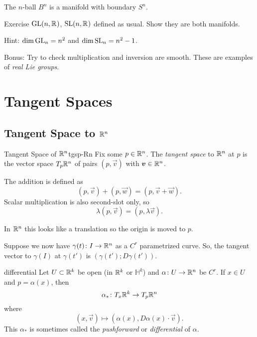 \documentclass{article}
\begin{document}
\begin{corollary}{}{}
  The $n$-ball $B^{n}$ is a manifold with boundary $S^{n}$.
\end{corollary}

\begin{example}{Exercise}{}
  $\GL(n, \RR)$, $\SL(n, \RR)$ defined as usual.
  Show they are both manifolds.

  Hint: $\dim \GL_{n} = n^{2}$ and $\dim \SL_{n} = n^{2} - 1$.

  Bonus: Try to check multiplication and inversion are smooth.
  These are examples of \emph{real Lie groups}.
\end{example}

\section{Tangent Spaces}

\subsection{Tangent Space to $\RR[n]$}

\begin{definition}{Tangent Space of $\RR[n]$}{tgsp-Rn}
  Fix some $p \in \RR[n]$.
  The \emph{tangent space} to $\RR[n]$ at $p$ is
  the vector space $T_{p}\RR[n]$ of pairs $(p, \vec{v})$
  with $\vec{v} \in \RR[n]$.

  The addition is defined as
  \[ (p, \vec{v}) + (p, \vec{w}) = (p, \vec{v} + \vec{w}). \]
  Scalar multiplication is also second-slot only, so
  \[ \lambda(p, \vec{v}) = (p, \lambda\vec{v}). \]
\end{definition}

In $\RR[n]$ this looks like a translation so the origin is moved to $p$.

Suppose we now have $\gamma(t) \from I \to \RR[n]$ as a $C^{r}$ parametrized curve.
So, the tangent vector to $\gamma(I)$ at $\gamma(t')$ is $(\gamma(t'); D\gamma(t'))$.

\begin{definition}{}{differential}
  Let $U \subset \RR[k]$ be open (in $\RR[k]$ or $\mathbb{H}^{k}$)
  and $\alpha \from U \to \RR[n]$ be $C^{r}$.
  If $x \in U$ and $p = \alpha(x)$, then
  \[ \alpha_{*} \from T_{x}\RR[k] \to T_{p}\RR[n] \]
  where
  \[ (x, \vec{v}) \mapsto (\alpha(x), D\alpha(x) \cdot \vec{v}). \]
  This $\alpha_{*}$ is sometimes called the \emph{pushforward} or
  \emph{differential} of $\alpha$.
\end{definition}
\end{document}
